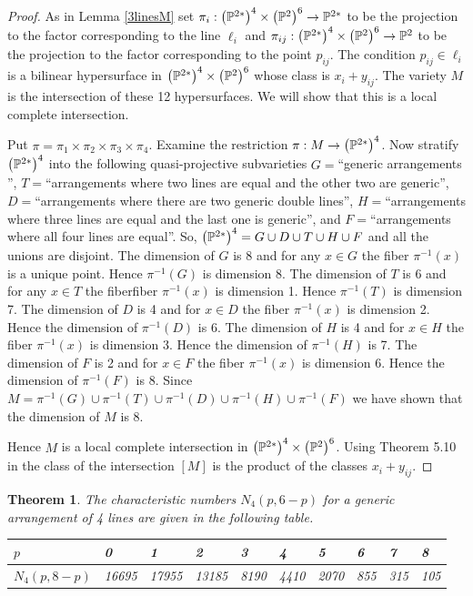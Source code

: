 \documentclass[12pt]{article}
\theoremstyle{plain}
\newtheorem{theorem}{Theorem}
\theoremstyle{definition}
\newcommand{\N}{N}
\renewcommand{\P}{\ensuremath \mathbb{P}}
\begin{document}
\begin{proof}

As in Lemma \ref{3linesM} set $\pi_i : \left( \P^{2*}\right)^4 \times \left( \P^2 \right)^6\to \P^{2*}$ to be the projection to the factor corresponding to the line $\ell_i$ and $\pi_{ij} : \left( \P^{2*}\right)^4 \times \left( \P^2 \right)^6\to \P^{2}$ to be the projection to the factor corresponding to the point $p_{ij}$. The condition $p_{ij}\in \ell_i$ is a bilinear hypersurface in $\left( \P^{2*}\right)^{4}\times \left( \P^{2}\right)^{6}$ whose class is $x_i+y_{ij}$. The variety $M$ is the intersection of these 12 hypersurfaces.  We will show that this is a local complete intersection.

Put $\pi=\pi_1\times \pi_2\times \pi_3\times \pi_4$. Examine the restriction $\pi :M \to \left(\P^{2*}\right)^4$. Now stratify $\left(\P^{2*}\right)^4$ into the following quasi-projective subvarieties $G=$``generic arrangements '', $T=$``arrangements where two lines are equal and the other two are generic'', $D=$``arrangements where there are two generic double lines'', $H=$``arrangements where three lines are equal and the last one is generic'', and $F=$``arrangements where all four lines are equal''. So, $\left(\P^{2*}\right)^4=G\cup D\cup T\cup H\cup F$ and all the unions are disjoint. The dimension of $G$ is 8 and for any $x\in G$ the fiber  $\pi^{-1}(x)$ is a unique point. Hence $\pi^{-1}(G)$ is dimension 8. The dimension of $T$ is 6 and for any $x\in T$ the fiberfiber  $\pi^{-1}(x)$ is dimension 1. Hence $\pi^{-1}(T)$ is dimension 7. The dimension of $D$ is 4 and for $x\in D$ the fiber  $\pi^{-1}(x)$ is dimension 2. Hence the dimension of $\pi^{-1}(D)$ is 6. The dimension of $H$ is 4 and for $x\in H$ the fiber  $\pi^{-1}(x)$ is dimension 3. Hence the dimension of $\pi^{-1}(H)$ is 7. The dimension of $F$ is 2 and for $x\in F$ the fiber  $\pi^{-1}(x)$ is dimension 6. Hence the dimension of $\pi^{-1}(F)$ is 8. Since $M=\pi^{-1}(G)\cup\pi^{-1}(T)\cup\pi^{-1}(D)\cup\pi^{-1}(H)\cup\pi^{-1}(F)$ we have shown that the dimension of $M$ is 8. 

Hence $M$ is a local complete intersection in $\left( \P^{2*}\right)^4 \times \left( \P^2 \right)^6$. Using Theorem 5.10 in \cite{EH} the class of the intersection $[M]$ is the product of the classes $x_i+y_{ij}$.
\end{proof}

\begin{theorem} \label{cn}
The characteristic numbers $\N_4(p,6-p)$ for a generic arrangement
of 4 lines are given in the following table.

\begin{tabular}{|l||l|l|l|l|l|l|l|l|l|}
\hline $p$ & 0 & 1 & 2 & 3 & 4 & 5 & 6 & 7 & 8 \\ \hline 


$\N_4(p,8-p)$ 
& 16695 & 17955 & 13185 & 8190 & 4410 & 2070 & 855 & 315 & 105  
\\ \hline
\end{tabular}


\end{theorem}
\end{document}
